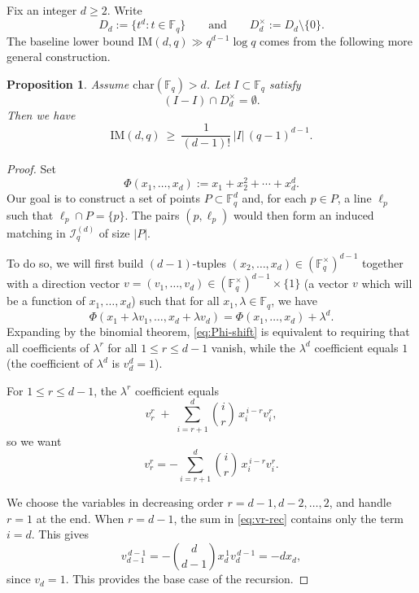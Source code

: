 \documentclass[12pt,reqno]{amsart}
\theoremstyle{plain}
\newtheorem{proposition}[theorem]{Proposition}
\theoremstyle{definition}
\newcommand{\F}{\mathbb{F}}
\newcommand{\IM}{\mathrm{IM}}
\newcommand{\II}{\mathcal{I}}
\newcommand{\1}{\mathbf{1}}
\begin{document}
Fix an integer $d\ge 2$. Write
\[
  D_d := \{t^d : t\in \F_q\}
  \qquad\text{and}\qquad
  D_d^\times := D_d\setminus\{0\}.
\]
The baseline lower bound $\IM(d,q) \gg q^{d-1} \log q$ comes from the following more general construction.
\begin{proposition}\label{prop:dth-power-highd}
Assume $\mathrm{char}(\F_q)>d$.
Let $I\subset \F_q$ satisfy
\[
  (I-I)\cap D_d^\times=\emptyset.
\]
Then we have
\[
  \IM(d,q)\ \ge\ \frac{1}{(d-1)!}\,|I|\,(q-1)^{d-1}.
\]
\end{proposition}

\begin{proof}
Set
\[
  \Phi(x_1,\dots,x_d):=x_1+x_2^2+\cdots+x_d^d.
\]
Our goal is to construct a set of points $P\subset \F_q^d$ and, for each $p\in P$, a line $\ell_p$ such that $\ell_p\cap P=\{p\}$. The pairs $(p,\ell_p)$ would then form an induced matching in $\II_q^{(d)}$ of size $|P|$.

To do so, we will first build $(d-1)$-tuples $(x_2,\dots,x_d)\in(\F_q^\times)^{d-1}$ together with a direction vector
$v=(v_1,\dots,v_d)\in(\F_q^\times)^{d-1}\times\{1\}$
 (a vector $v$ which will be a function of $x_1,\ldots,x_{d}$) such that for all $x_1,\lambda \in \mathbb{F}_{q}$, we have
\begin{equation}\label{eq:Phi-shift}
  \Phi(x_1+\lambda v_1,\dots,x_d+\lambda v_d)=\Phi(x_1,\dots,x_d)+\lambda^d.
\end{equation}
Expanding by the binomial theorem, \eqref{eq:Phi-shift} is equivalent to requiring that all coefficients
of $\lambda^r$ for all $1\le r\le d-1$ vanish, while the $\lambda^d$ coefficient equals $1$ (the coefficient of $\lambda^d$ is $v_d^d=1$).

For $1\le r\le d-1$, the $\lambda^r$ coefficient equals
\[
  v_r^r\;+\;\sum_{i=r+1}^d \binom{i}{r}\,x_i^{\,i-r}v_i^r,
\]
so we want
\begin{equation}\label{eq:vr-rec}
  v_r^r = -\sum_{i=r+1}^d \binom{i}{r}\,x_i^{\,i-r} v_i^r.
\end{equation}

We choose the variables in decreasing order $r=d-1,d-2,\dots,2$, and handle $r=1$ at the end. When $r=d-1$, the sum in \eqref{eq:vr-rec} contains only the term $i=d$. This gives
$$v_{d-1}^{\,d-1} = -{d \choose d-1} x_d^{\,1}v_d^{\,d-1} = -d x_d,$$
since $v_{d}=1$. This provides the base case of the recursion.


\end{proof}
\end{document}
